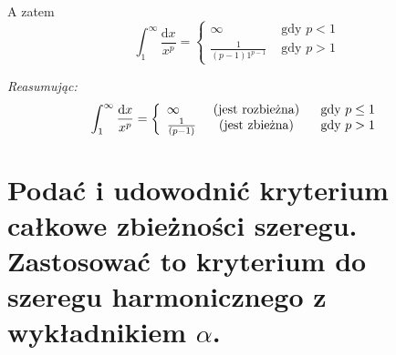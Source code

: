 \documentclass{article}
\numberwithin{equation}{section}
\theoremstyle{definition}
\theoremstyle{case}
\begin{document}
A zatem
\begin{equation*}
	\int_1^\infty \frac{\mathrm{d}x}{x^p}
	= \left\{
		\begin{array}{ll}
			\infty & \text{ gdy } p< 1
			\\ \frac{1}{(p-1)1^{p-1}} & \text{ gdy } p> 1
		\end{array}
	\right. %
\end{equation*}

\textit{Reasumując:}
\begin{equation*}
	\int_1^\infty \frac{\mathrm{d}x}{x^p}
	= \left\{
		\begin{array}{lcl}
			\infty & \textnormal{ (jest rozbieżna) } & \text{ gdy } p\leq1
			\\ \frac{1}{(p-1)} & \textnormal{ (jest zbieżna) } & \text{ gdy } p>1
		\end{array}
	\right. %
\end{equation*}

\section{Podać i udowodnić kryterium całkowe zbieżności szeregu.
	Zastosować to kryterium do szeregu harmonicznego z wykładnikiem
	\texorpdfstring{$ \alpha $}{a}.
}
\end{document}
